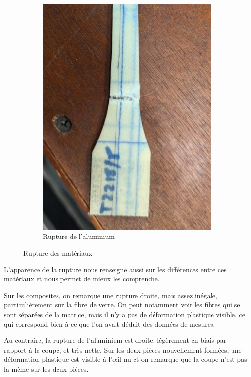 \begin{figure}[!htb]
\begin{subfigure}[t]{.33\textwidth}
        \includegraphics[width=\textwidth]{../ressources/images/verre_rupture}
        \caption{Rupture de l'aluminium}
        \label{Fibre de verre}
    \end{subfigure}
    \caption{Rupture des matériaux}
\end{figure}

L'apparence de la rupture nous renseigne aussi sur les différences entre ces matériaux et nous permet de mieux les comprendre.

\smallskip
Sur les composites, on remarque une rupture droite, mais assez inégale, particulièrement sur la fibre de verre.
On peut notamment voir les fibres qui se sont séparées de la matrice, mais il n'y a pas de déformation plastique visible, ce qui correspond bien à ce que l'on avait déduit des données de mesures.

\smallskip
Au contraire, la rupture de l'aluminium est droite, légèrement en biais par rapport à la coupe, et très nette.
Sur les deux pièces nouvellement formées, une déformation plastique est visible à l'œil nu et on remarque que la coupe n'est pas la même sur les deux pièces.


